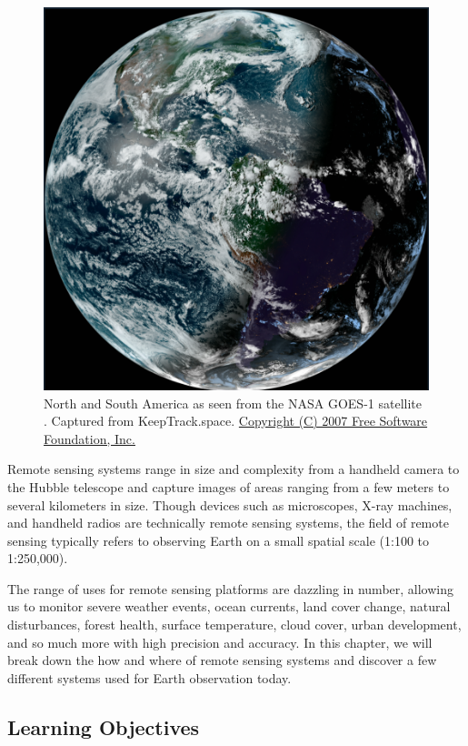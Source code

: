\documentclass[
]{book}
\begin{document}
\begin{figure}
\includegraphics[width=0.75\linewidth]{images/12-GOES_1_earth} \caption{North and South America as seen from the NASA GOES-1 satellite \citep{nasa_goes-1_nodate}. Captured from KeepTrack.space. \href{https://fsf.org/}{Copyright (C) 2007 Free Software Foundation, Inc.}}\label{fig:12-GOES-1-earth}
\end{figure}

Remote sensing systems range in size and complexity from a handheld camera to the Hubble telescope and capture images of areas ranging from a few meters to several kilometers in size. Though devices such as microscopes, X-ray machines, and handheld radios are technically remote sensing systems, the field of remote sensing typically refers to observing Earth on a small spatial scale (1:100 to 1:250,000).

The range of uses for remote sensing platforms are dazzling in number, allowing us to monitor severe weather events, ocean currents, land cover change, natural disturbances, forest health, surface temperature, cloud cover, urban development, and so much more with high precision and accuracy. In this chapter, we will break down the how and where of remote sensing systems and discover a few different systems used for Earth observation today.

\subsection*{Learning Objectives}\label{learning-objectives-9}
\end{document}
